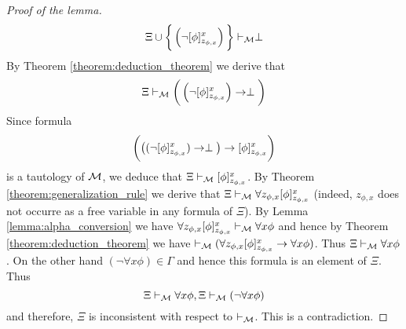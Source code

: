 \begin{proof}[Proof of the lemma]
$$\Xi \cup \bigg\{\left(\neg[\phi]^x_{z_{\phi,x}}\right)\bigg\} \vdash_{{\mathcal M}} \perp$$
By Theorem \ref{theorem:deduction_theorem} we derive that
$$\Xi \vdash_{{\mathcal M}} \bigg(\left(\neg[\phi]^x_{z_{\phi,x}}\right) \rightarrow \perp\bigg)$$
Since formula
$$\bigg (\big((\neg[\phi]^x_{z_{\phi,x}}) \rightarrow \perp \big) \rightarrow [\phi]^x_{z_{\phi,x}}\bigg)$$
is a tautology of ${\mathcal M}$, we deduce that $\Xi \vdash_{{\mathcal M}} [\phi]^x_{z_{\phi,x}}$. By Theorem \ref{theorem:generalization_rule} we derive that $\Xi \vdash_{{\mathcal M}} \forall z_{\phi,x} [\phi]^x_{z_{\phi,x}}$ (indeed, $z_{\phi,x}$ does not occurre as a free variable in any formula of $\Xi$). By Lemma \ref{lemma:alpha_conversion} we have $\forall z_{\phi,x} [\phi]^x_{z_{\phi,x}} \vdash_{{\mathcal M}} \forall x\phi$ and hence by Theorem \ref{theorem:deduction_theorem} we have $\vdash_{{\mathcal M}} (\forall z_{\phi,x} [\phi]^x_{z_{\phi,x}} \rightarrow \forall x\phi)$. Thus $\Xi \vdash_{{\mathcal M}} \forall x\phi$. On the other hand $(\neg\forall x\phi) \in \Gamma$ and hence this formula is an element of $\Xi$. Thus
$$\Xi \vdash_{{\mathcal M}} \forall x\phi, \Xi \vdash_{{\mathcal M}} (\neg\forall x\phi)$$
and therefore, $\Xi$ is inconsistent with respect to $\vdash_{{\mathcal M}}$. This is a contradiction.
\end{proof}

